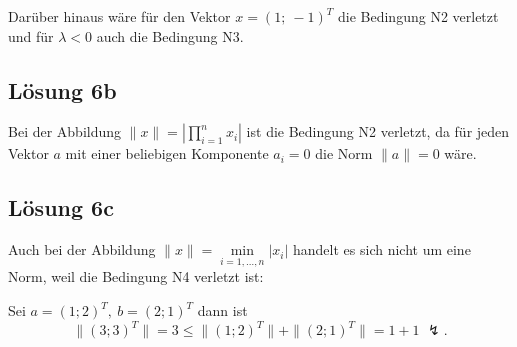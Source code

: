 \documentclass[main.tex]{subfiles}
\begin{document}
\textcolor[rgb]{0.28,0.71,0.02}{
    Darüber hinaus wäre für den Vektor $x=( 1;\ -1)^{T}$ die Bedingung N2 verletzt und für $\lambda < 0$ auch die Bedingung N3.
}


\subsection{Lösung 6b}

Bei der Abbildung $\| x\| =\left| \prod _{i=1}^{n} x_{i}\right| $ ist die Bedingung N2 verletzt, da für jeden Vektor $a$ mit einer beliebigen Komponente $a_{i} =0$ die Norm $\| a\| =0$ wäre.



\subsection{Lösung 6c}

Auch bei der Abbildung $\| x\| =\underset{i=1,\dotsc ,n}{\min}| x_{i}| $ handelt es sich nicht um eine Norm, weil die Bedingung N4 verletzt ist:

Sei $a=( 1;2)^{T} ,\ b=( 2;1)^{T}$ dann ist 
\begin{equation*}
    \| ( 3;3)^{T} \| =3\leq \| ( 1;2)^{T} \| +\| ( 2;1)^{T} \| =1+1\,\, \lightning .
\end{equation*}
\end{document}
